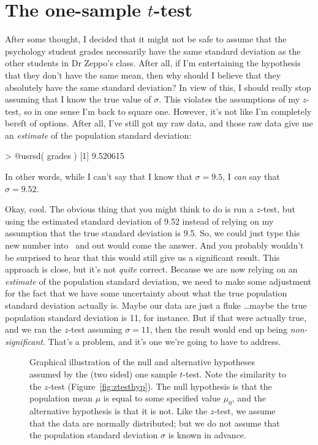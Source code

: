 \section{The one-sample $t$-test~\label{sec:onesamplettest}}

After some thought, I decided that it might not be safe to assume that the psychology student grades necessarily have the same standard deviation as the other students in Dr Zeppo's class. After all, if I'm entertaining the hypothesis that they don't have the same mean, then why should I believe that they absolutely have the same standard deviation? In view of this, I should really stop assuming that I know the true value of $\sigma$. This violates the assumptions of my $z$-test, so in one sense I'm back to square one. However, it's not like I'm completely bereft of options. After all, I've still got my raw data, and those raw data give me an {\it estimate} of the population standard deviation: 
\begin{rblock1}
> @usr{sd( grades )}
[1] 9.520615
\end{rblock1}
In other words, while I can't say that I know that $\sigma = 9.5$, I {\it can} say that $\hat\sigma = 9.52$. 

Okay, cool. The obvious thing that you might think to do is run a $z$-test, but using the estimated standard deviation of 9.52 instead of relying on my assumption that the true standard deviation is 9.5. So, we could just type this new number into \R\ and out would come the answer. And you probably wouldn't be surprised to hear that this would still give us a significant result. This approach is close, but it's not {\it quite} correct. Because we are now relying on an {\it estimate} of the population standard deviation, we need to make some adjustment for the fact that we have some uncertainty about what the true population standard deviation actually is. Maybe our data are just a fluke \ldots maybe the true population standard deviation is 11, for instance. But if that were actually true, and we ran the $z$-test assuming $\sigma=11$, then the result would end up being {\it non-significant}. That's a problem, and it's one we're going to have to address.


\begin{figure}
\begin{center}
\caption{Graphical illustration of the null and alternative hypotheses assumed by the (two sided) one sample $t$-test. Note the similarity to the $z$-test (Figure~\ref{fig:ztesthyp}). The null hypothesis is that the population mean $\mu$ is equal to some specified value $\mu_0$, and the alternative hypothesis is that it is not. Like the $z$-test, we assume that the data are normally distributed; but we do not assume that the population standard deviation $\sigma$ is known in advance.}
\HR
\label{fig:ttesthyp_onesample}
\end{center}
\end{figure}


